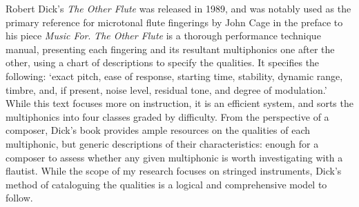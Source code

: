Robert Dick’s \emph{The Other Flute} was released in 1989, and was notably used as the primary reference for microtonal flute fingerings by John Cage in the preface to his piece \emph{Music For}.\autocite{cageMusicPartsVoice1984} 
\emph{The Other Flute} is a thorough performance technique manual, presenting each fingering and its resultant multiphonics one after the other, using a chart of descriptions to specify the qualities.\autocite[86--135]{dickOtherFlute1989} 
It specifies the following: ‘exact pitch, ease of response, starting time, stability, dynamic range, timbre, and, if present, noise level, residual tone, and degree of modulation.’\autocite[84]{dickOtherFlute1989} 
While this text focuses more on instruction, it is an efficient system, and sorts the multiphonics into four classes graded by difficulty. 
From the perspective of a composer, Dick’s book provides ample resources on the qualities of each multiphonic, but generic descriptions of their characteristics: enough for a composer to assess whether any given multiphonic is worth investigating with a flautist. %
While the scope of my research focuses on stringed instruments, Dick’s method of cataloguing the qualities is a logical and comprehensive model to follow.

